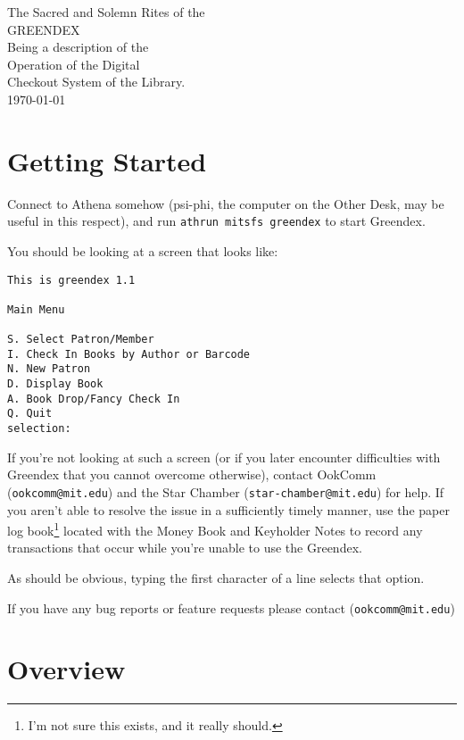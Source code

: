 \documentclass[12pt]{article}
\begin{document}
\begin{center} \def\baselinestretch{1.25}
\huge
The Sacred and Solemn Rites of the \\
GREENDEX\\
\vfil
\Large
Being a description of the  \\
Operation of the Digital \\ 
Checkout System of the Library. \\
\vfil
\normalsize
\today
\end{center}

\thispagestyle{empty}

\newpage

\addtocounter{page}{-1}

\section{Getting Started}

Connect to Athena somehow (psi-phi, the computer on the Other Desk, may be
useful in this respect), and run \texttt{athrun mitsfs greendex} to start
Greendex.

You should be looking at a screen that looks like:

\begin{verbatim}
This is greendex 1.1

Main Menu

S. Select Patron/Member
I. Check In Books by Author or Barcode
N. New Patron
D. Display Book
A. Book Drop/Fancy Check In
Q. Quit
selection: 
\end{verbatim}

If you're not looking at such a screen (or if you later encounter
difficulties with Greendex that you cannot overcome otherwise), contact
OokComm (\texttt{ookcomm@mit.edu}) and the Star Chamber
(\texttt{star-chamber@mit.edu}) for help.  If you aren't able to resolve
the issue in a sufficiently timely manner, use the paper log
book\footnote{I'm not sure this exists, and it really should.}
located with the Money Book and Keyholder Notes to record any
transactions that occur while you're unable to use the Greendex.

As should be obvious, typing the first character of a line selects that
option.

If you have any bug reports or feature requests please contact
(\texttt{ookcomm@mit.edu})

\section{Overview}
\end{document}
